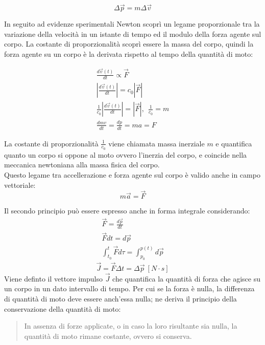 \documentclass{article}
\numberwithin{equation}{subsection}
\begin{document}
\begin{equation}
    \Delta\vec{p}=m\Delta\vec{v}
\end{equation}

In seguito ad evidenze sperimentali Newton scoprì un legame 
proporzionale tra la variazione della velocità in un istante di tempo 
ed il modulo della forza agente sul corpo. La costante di proporzionalità 
scoprì essere la massa del corpo, quindi la forza agente 
su un corpo è la derivata rispetto al tempo della quantità di 
moto:

\begin{gather*}
    \displaystyle\frac{d\vec{v}(t)}{dt}\propto\vec{F}\\
    \left|\displaystyle\frac{d\vec{v}(t)}{dt}\right|=c_0\left|\vec{F}\right|\\
    \frac{1}{c_0} \left|\displaystyle\frac{d\vec{v}(t)}{dt}\right|=\left|\vec{F}\right|{,}\:\:\frac{1}{c_0}=m\\
    \displaystyle\frac{dmv}{dt}=\frac{dp}{dt}=ma=F
\end{gather*}

La costante di proporzionalità $\displaystyle\frac{1}{c_0}$ viene chiamata massa 
inerziale $m$ e quantifica quanto un corpo si oppone al moto ovvero l'inerzia 
del corpo, e 
coincide nella meccanica newtoniana alla massa fisica del corpo.\\
Questo legame tra accellerazione e forza agente sul corpo è valido 
anche in campo vettoriale: 
\begin{equation}
    m\vec{a}=\vec{F}
\end{equation}

Il secondo principio può essere espresso anche in forma integrale 
considerando: 
\begin{gather*}
    \vec{F}=\displaystyle\frac{d\vec{p}}{dt}\\
    \vec{F}dt=d\vec{p}\\
    \displaystyle\int_{t_0}^{t}\vec{F}d\tau=\int_{p_0}^{p(t)}d\vec{p}
\end{gather*}
\begin{equation}
    \vec{J}=\vec{F}\Delta t=\Delta\vec{p}\:[N\cdot s]
\end{equation}
Viene definto il vettore impulso $\vec{J}$ che quantifica la quantità 
di forza che agisce su un corpo in un dato intervallo di tempo. 
Per cui se la forza è nulla, la differenza di quantità di moto deve essere anch'essa nulla; ne deriva il 
principio della conservazione della quantità di moto:
\begin{quotation}
    In assenza di forze applicate, o in caso la loro risultante sia nulla, la quantità di moto rimane costante, ovvero si conserva. 
\end{quotation}
\end{document}
